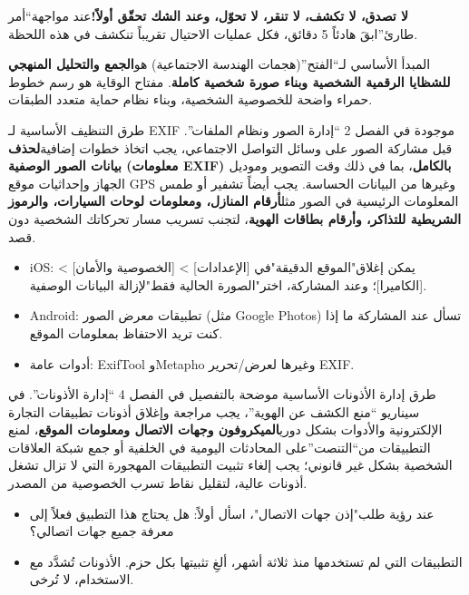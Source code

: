 
\textbf{لا تصدق، لا تكشف، لا تنقر، لا تحوّل، وعند الشك تحقّق أولاً!}عند مواجهة“أمر طارئ”ابقَ هادئاً 5 دقائق، فكل عمليات الاحتيال تقريباً تنكشف في هذه اللحظة.


المبدأ الأساسي لـ“الفتح”(هجمات الهندسة الاجتماعية) هو\textbf{الجمع والتحليل المنهجي للشظايا الرقمية الشخصية وبناء صورة شخصية كاملة}. مفتاح الوقاية هو رسم خطوط حمراء واضحة للخصوصية الشخصية، وبناء نظام حماية متعدد الطبقات.


طرق التنظيف الأساسية لـ EXIF موجودة في الفصل 2 “إدارة الصور ونظام الملفات”. قبل مشاركة الصور على وسائل التواصل الاجتماعي، يجب اتخاذ خطوات إضافية\textbf{لحذف بيانات الصور الوصفية (معلومات EXIF) بالكامل}، بما في ذلك وقت التصوير وموديل الجهاز وإحداثيات موقع GPS وغيرها من البيانات الحساسة. يجب أيضاً تشفير أو طمس المعلومات الرئيسية في الصور مثل\textbf{أرقام المنازل، ومعلومات لوحات السيارات، والرموز الشريطية للتذاكر، وأرقام بطاقات الهوية}، لتجنب تسريب مسار تحركاتك الشخصية دون قصد.

\begin{itemize}
  \item iOS: يمكن إغلاق"الموقع الدقيقة"في [الإعدادات] > [الخصوصية والأمان] > [الكاميرا]؛ وعند المشاركة، اختر"الصورة الحالية فقط"لإزالة البيانات الوصفية.
  \item Android: تطبيقات معرض الصور (مثل Google Photos) تسأل عند المشاركة ما إذا كنت تريد الاحتفاظ بمعلومات الموقع.
  \item أدوات عامة: ExifTool وMetapho وغيرها لعرض/تحرير EXIF.
\end{itemize}


طرق إدارة الأذونات الأساسية موضحة بالتفصيل في الفصل 4 “إدارة الأذونات”. في سيناريو “منع الكشف عن الهوية”، يجب مراجعة وإغلاق أذونات تطبيقات التجارة الإلكترونية والأدوات بشكل دوري\textbf{الميكروفون وجهات الاتصال ومعلومات الموقع}، لمنع التطبيقات من“التنصت”على المحادثات اليومية في الخلفية أو جمع شبكة العلاقات الشخصية بشكل غير قانوني؛ يجب إلغاء تثبيت التطبيقات المهجورة التي لا تزال تشغل أذونات عالية، لتقليل نقاط تسرب الخصوصية من المصدر.

\begin{itemize}
  \item عند رؤية طلب"إذن جهات الاتصال"، اسأل أولاً: هل يحتاج هذا التطبيق فعلاً إلى معرفة جميع جهات اتصالي؟
  \item التطبيقات التي لم تستخدمها منذ ثلاثة أشهر، ألغِ تثبيتها بكل حزم. الأذونات تُشدَّد مع الاستخدام، لا تُرخى.
\end{itemize}

